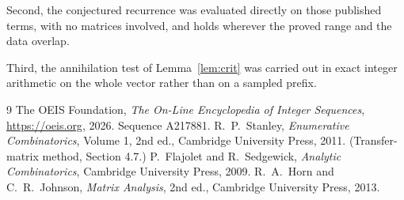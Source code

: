\documentclass[11pt,a4paper]{article}
\theoremstyle{plain}
\theoremstyle{definition}
\begin{document}
Second, the conjectured recurrence was evaluated directly on those published terms, with no
matrices involved, and holds wherever the proved range and the data overlap.

Third, the annihilation test of Lemma~\ref{lem:crit} was carried out in exact integer
arithmetic on the whole vector rather than on a sampled prefix.

\begin{thebibliography}{9}
 The OEIS Foundation, \emph{The On-Line Encyclopedia of Integer
Sequences}, \url{https://oeis.org}, 2026. Sequence A217881.
 R.~P.~Stanley, \emph{Enumerative Combinatorics}, Volume 1, 2nd ed.,
Cambridge University Press, 2011. (Transfer-matrix method, Section 4.7.)
 P.~Flajolet and R.~Sedgewick, \emph{Analytic Combinatorics}, Cambridge
University Press, 2009.
 R.~A.~Horn and C.~R.~Johnson, \emph{Matrix Analysis}, 2nd ed., Cambridge
University Press, 2013.
\end{thebibliography}
\end{document}
